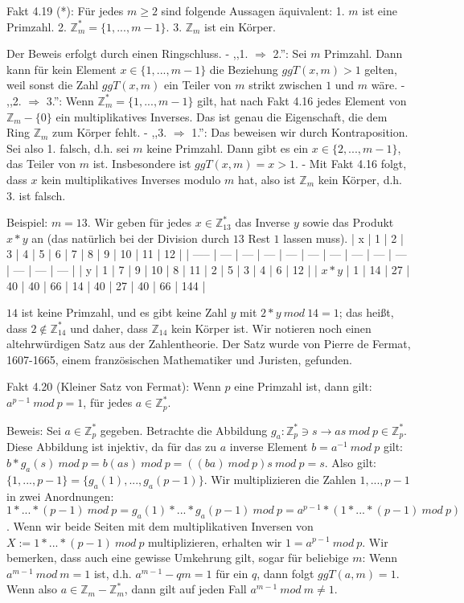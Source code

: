 \documentclass[a4paper]{article}
\begin{document}
\begin{multicols}{3}
    Fakt 4.19 (*): Für jedes $m\geq 2$ sind folgende Aussagen äquivalent:
    1. $m$ ist eine Primzahl.
    2. $\mathbb{Z}^*_m=\{ 1 ,...,m-1\}$.
    3. $\mathbb{Z}_m$ ist ein Körper.

    Der Beweis erfolgt durch einen Ringschluss.
    - ,,1. $\Rightarrow$ 2.'': Sei $m$ Primzahl. Dann kann für kein Element $x\in\{1 ,...,m-1\}$ die Beziehung $ggT(x,m)>1$ gelten, weil sonst die Zahl $ggT(x,m)$ ein Teiler von $m$ strikt zwischen $1$ und $m$ wäre.
    - ,,2. $\Rightarrow$ 3.'': Wenn $\mathbb{Z}^*_m=\{1 ,...,m-1\}$ gilt, hat nach Fakt 4.16 jedes Element von $\mathbb{Z}_m -\{0\}$ ein multiplikatives Inverses. Das ist genau die Eigenschaft, die dem Ring $\mathbb{Z}_m$ zum Körper fehlt.
    - ,,3. $\Rightarrow$ 1.'': Das beweisen wir durch Kontraposition. Sei also 1. falsch, d.h. sei $m$ keine Primzahl. Dann gibt es ein $x\in\{2,...,m-1\}$, das Teiler von $m$ ist. Insbesondere ist $ggT(x,m) =x >1$.
    - Mit Fakt 4.16 folgt, dass $x$ kein multiplikatives Inverses modulo $m$ hat, also ist $\mathbb{Z}_m$ kein Körper, d.h. 3. ist falsch.

    Beispiel: $m=13$. Wir geben für jedes $x\in\mathbb{Z}^*_{13}$ das Inverse $y$ sowie das Produkt $x*y$ an (das natürlich bei der Division durch $13$ Rest $1$ lassen muss).
    | x     | 1   | 2   | 3   | 4   | 5   | 6   | 7   | 8   | 9   | 10  | 11  | 12  |
    | ----- | --- | --- | --- | --- | --- | --- | --- | --- | --- | --- | --- | --- |
    | y     | 1   | 7   | 9   | 10  | 8   | 11  | 2   | 5   | 3   | 4   | 6   | 12  |
    | $x*y$ | 1   | 14  | 27  | 40  | 40  | 66  | 14  | 40  | 27  | 40  | 66  | 144 |

    $14$ ist keine Primzahl, und es gibt keine Zahl $y$ mit $2*y\ mod\ 14 = 1$; das heißt, dass $2\not\in\mathbb{Z}^*_{14}$ und daher, dass $\mathbb{Z}_{14}$ kein Körper ist.
    Wir notieren noch einen altehrwürdigen Satz aus der Zahlentheorie. Der Satz wurde von Pierre de Fermat, 1607-1665, einem französischen Mathematiker und Juristen, gefunden.

    Fakt 4.20 (Kleiner Satz von Fermat): Wenn $p$ eine Primzahl ist, dann gilt: $a^{p-1}\ mod\ p= 1$, für jedes $a\in\mathbb{Z}^*_p$.

    Beweis: Sei $a\in\mathbb{Z}^*_p$ gegeben. Betrachte die Abbildung $g_a: \mathbb{Z}^*_p \owns s\rightarrow as\ mod\ p\in\mathbb{Z}^*_p$. Diese Abbildung ist injektiv, da für das zu $a$ inverse Element $b=a^{-1}\ mod\ p$ gilt: $b*g_a(s)\ mod\ p=b(as)\ mod\ p=((ba)\ mod\ p)s\ mod\ p=s$. Also gilt: $\{1,...,p-1\}=\{g_a(1),...,g_a(p-1)\}$.
    Wir multiplizieren die Zahlen $1,...,p-1$ in zwei Anordnungen: $1*...*(p-1)\ mod\ p =g_a(1) *...*g_a(p-1)\ mod\ p=a^{p-1} *(1*...*(p-1)\ mod\ p)$.
    Wenn wir beide Seiten mit dem multiplikativen Inversen von $X:= 1*...*(p-1)\ mod\ p$ multiplizieren, erhalten wir $1=a^{p-1}\ mod\ p$.
    Wir bemerken, dass auch eine gewisse Umkehrung gilt, sogar für beliebige $m$: Wenn $a^{m-1}\ mod\ m=1$ ist, d.h. $a^{m-1}-qm=1$ für ein $q$, dann folgt $ggT(a,m)=1$. Wenn also $a\in\mathbb{Z}_m -\mathbb{Z}^*_m$, dann gilt auf jeden Fall $a^{m-1}\ mod\ m\not= 1$.


\end{multicols}
\end{document}
